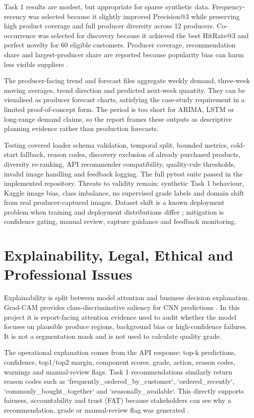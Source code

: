 \documentclass[11pt,a4paper]{article}
\begin{document}
Task 1 results are modest, but appropriate for sparse synthetic data. Frequency-recency was selected because it slightly improved Precision@3 while preserving high product coverage and full producer diversity across 12 producers. Co-occurrence was selected for discovery because it achieved the best HitRate@3 and perfect novelty for 60 eligible customers. Producer coverage, recommendation share and largest-producer share are reported because popularity bias can harm less visible suppliers \citep{klimashevskaia2024popularity}.

The producer-facing trend and forecast files aggregate weekly demand, three-week moving averages, trend direction and predicted next-week quantity. They can be visualised as producer forecast charts, satisfying the case-study requirement in a limited proof-of-concept form. The period is too short for ARIMA, LSTM or long-range demand claims, so the report frames these outputs as descriptive planning evidence rather than production forecasts.

Testing covered loader schema validation, temporal split, bounded metrics, cold-start fallback, reason codes, discovery exclusion of already purchased products, diversity re-ranking, API recommender compatibility, quality-rule thresholds, invalid image handling and feedback logging. The full pytest suite passed in the implemented repository. Threats to validity remain: synthetic Task 1 behaviour, Kaggle image bias, class imbalance, no supervised grade labels and domain shift from real producer-captured images. Dataset shift is a known deployment problem when training and deployment distributions differ \citep{quinonero2009datasetshift}; mitigation is confidence gating, manual review, capture guidance and feedback monitoring.

\section{Explainability, Legal, Ethical and Professional Issues}
Explainability is split between model attention and business decision explanation. Grad-CAM provides class-discriminative saliency for CNN predictions \citep{selvaraju2017gradcam}. In this project it is report-facing attention evidence used to audit whether the model focuses on plausible produce regions, background bias or high-confidence failures. It is not a segmentation mask and is not used to calculate quality grade.

The operational explanation comes from the API response: top-k predictions, confidence, top1/top2 margin, component scores, grade, action, reason codes, warnings and manual-review flags. Task 1 recommendations similarly return reason codes such as `frequently\_ordered\_by\_customer`, `ordered\_recently`, `commonly\_bought\_together` and `seasonally\_available`. This directly supports fairness, accountability and trust (FAT) because stakeholders can see why a recommendation, grade or manual-review flag was generated \citep{uwe_faq_2026}.
\end{document}
